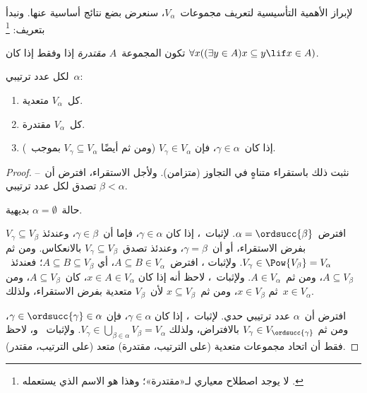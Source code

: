 \documentclass[../../../include/open-logic-section]{subfiles}
\begin{document}

لإبراز الأهمية التأسيسية لتعريف مجموعات~$V_\alpha$، سنعرض بضع نتائج
أساسية عنها. ونبدأ بتعريف:
\footnote{لا يوجد اصطلاح معياري لـ«مقتدرة»؛ وهذا هو الاسم الذي يستعمله
  \citet{ButtonLT1}.}
\begin{defn}
	تكون المجموعة~$A$ \emph{مقتدرة} إذا وفقط إذا كان
	$\forall x((\exists y \in A)x \subseteq y \lif x \in A)$.
\end{defn}
\begin{lem}
لكل عدد ترتيبي~$\alpha$:
\begin{enumerate}
	\item{} كل~$V_\alpha$ متعدية.
	\item{} كل~$V_\alpha$ مقتدرة.
	\item{} إذا كان~$\gamma \in \alpha$، فإن
	$V_\gamma \in V_\alpha$ (ومن ثم أيضًا
	$V_\gamma \subseteq V_\alpha$ بموجب~).
\end{enumerate}
\end{lem}

\begin{proof}
نثبت ذلك باستقراء متناهٍ في التجاوز (متزامن). ولأجل الاستقراء، افترض
أن~-- تصدق لكل عدد ترتيبي
$\beta < \alpha$.

حالة~$\alpha = \emptyset$ بديهية.

افترض~$\alpha = \ordsucc{\beta}$. لإثبات~، إذا كان
$\gamma \in \alpha$، فإما أن~$\gamma \in \beta$، وعندئذ
$V_\gamma \subseteq V_\beta$ بفرض الاستقراء، أو أن~$\gamma = \beta$،
وعندئذ تصدق~$V_\gamma \subseteq V_\beta$ بالانعكاس. ومن ثم
$V_\gamma \in \Pow{V_\beta} = V_\alpha$. ولإثبات
، افترض~$A \subseteq B \in V_\alpha$، أي
$A \subseteq B \subseteq V_\beta$؛ فعندئذ~$A \subseteq V_\beta$، ومن
ثم~$A \in V_\alpha$. ولإثبات~، لاحظ أنه إذا كان
$x \in A \in V_\alpha$، كان~$A \subseteq V_\beta$، ومن ثم
$x \in V_\beta$، ومن ثم~$x \subseteq V_\beta$ لأن~$V_\beta$ متعدية
بفرض الاستقراء، ولذلك~$x \in V_\alpha$.

افترض أن~$\alpha$ عدد ترتيبي حدي. لإثبات~، إذا كان
$\gamma \in \alpha$، فإن
$\gamma \in \ordsucc{\gamma} \in \alpha$، ومن ثم
$V_\gamma \in V_{\ordsucc{\gamma}}$ بالافتراض، ولذلك
$V_\gamma \in \bigcup_{\beta \in \alpha} V_\beta = V_\alpha$.
ولإثبات~ و، لاحظ فقط أن اتحاد
مجموعات متعدية (على الترتيب، مقتدرة) متعد (على الترتيب، مقتدر).
\end{proof}
\end{document}
